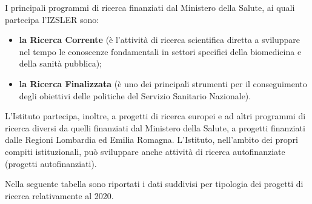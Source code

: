 \documentclass[
  12pt,
]{article}
\begin{document}
I principali programmi di ricerca finanziati dal Ministero della Salute,
ai quali partecipa l'IZSLER sono:

\begin{itemize}
\item
  \textbf{la Ricerca Corrente} (è l'attività di ricerca scientifica
  diretta a sviluppare nel tempo le conoscenze fondamentali in settori
  specifici della biomedicina e della sanità pubblica);
\item
  \textbf{la Ricerca Finalizzata} (è uno dei principali strumenti per il
  conseguimento degli obiettivi delle politiche del Servizio Sanitario
  Nazionale).
\end{itemize}

L'Istituto partecipa, inoltre, a progetti di ricerca europei e ad altri
programmi di ricerca diversi da quelli finanziati dal Ministero della
Salute, a progetti finanziati dalle Regioni Lombardia ed Emilia Romagna.
L'Istituto, nell'ambito dei propri compiti istituzionali, può sviluppare
anche attività di ricerca autofinanziate (progetti autofinanziati).

Nella seguente tabella sono riportati i dati suddivisi per tipologia dei
progetti di ricerca relativamente al 2020.
\end{document}
